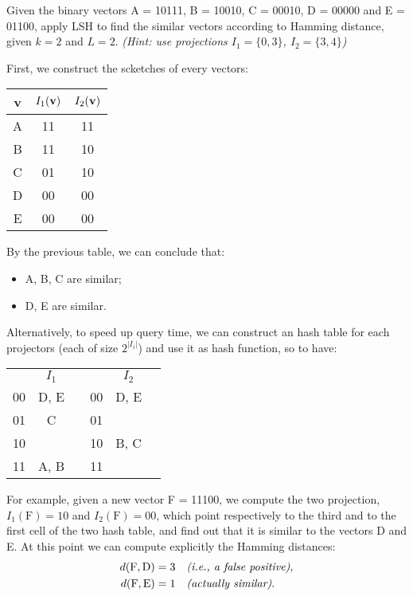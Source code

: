 \exercise

Given the binary vectors A = 10111, B = 10010, C = 00010, D = 00000 and E =
01100, apply LSH to find the similar vectors according to Hamming distance,
given $k = 2$ and $L = 2$. \emph{(Hint: use projections $I_1 = \{0, 3\}$, $I_2 =
\{3, 4\}$)}

\solution

First, we construct the scketches of every vectors:
%
\begin{table}[H]
  \centering
  \begin{tabular}{c|c|c}
    {\bf v} & $I_1(\text{\bf v})$ & $I_2(\text{\bf v})$ \\ \hline
    A & 11 & 11 \\
    B & 11 & 10 \\
    C & 01 & 10 \\
    D & 00 & 00 \\
    E & 00 & 00 \\
  \end{tabular}
\end{table}

By the previous table, we can conclude that:
%
\begin{itemize}
  \item A, B, C are similar;
  \item D, E are similar.
\end{itemize}

Alternatively, to speed up query time, we can construct an hash table for each
projectors (each of size $2^{|I_i|}$) and use it as hash function, so to have:
%
\begin{table}[h]
  \centering
  \begin{tabular}{c|c|cc|c|c}
    \multicolumn{1}{c}{} &
    \multicolumn{1}{c}{$I_1$} &
    \multicolumn{1}{c}{} &
    \multicolumn{1}{c}{} &
    \multicolumn{1}{c}{$I_2$} & \\ \cline{2-2} \cline{5-5}
    00 & D, E & & 00 & D, E & \\ \cline{2-2} \cline{5-5}
    01 & C & & 01 & & \\ \cline{2-2} \cline{5-5}
    10 & & & 10 & B, C & \\ \cline{2-2} \cline{5-5}
    11 & A, B & & 11 & & \\ \cline{2-2} \cline{5-5}
  \end{tabular}
\end{table}

For example, given a new vector F = 11100, we compute the two projection,
$I_1(\text{F}) = 10$ and $I_2(\text{F}) = 00$, which point respectively to the
third and to the first cell of the two hash table, and find out that it is
similar to the vectors D and E. At this point we can compute explicitly the
Hamming distances:
%
\begin{align*}
  d(\text{F}, \text{D}) &= 3 \quad \text{\em (i.e., a false positive)},\\
  d(\text{F}, \text{E}) &= 1 \quad \text{\em (actually similar)}.
\end{align*}
